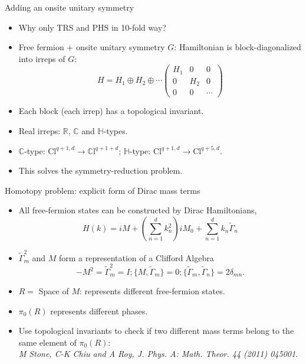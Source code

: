 \documentclass[xcolor=table, 11pt, aspectratio=169]{beamer}
\begin{document}
    \begin{frame}{Adding an onsite unitary symmetry}
      \begin{itemize}
        \item<1-> Why only TRS and PHS in 10-fold way?
        \item<2-> Free fermion + onsite unitary symmetry $G$: Hamiltonian is block-diagonalized into irreps of $G$:
        \[H=H_1\oplus H_2\oplus\cdots\begin{pmatrix}
          H_1 & 0 & 0\\
          0 & H_2 & 0\\
          0 & 0 & \cdots
        \end{pmatrix}\]
        \item<2-> Each block (each irrep) has a topological invariant.
        \item<3-> Real irreps: $\mathbb R$, $\mathbb C$ and $\mathbb H$-types.
        \item<3-> $\mathbb C$-type: $\mathrm{Cl}^{q+1,d}\rightarrow \mathbb{C}\mathrm{l}^{q+1+d}$;
        $\mathbb H$-type: $\mathrm{Cl}^{q+1,d}\rightarrow \mathrm{Cl}^{q+5,d}$.
        \item<4-> This solves the symmetry-reduction problem.
      \end{itemize}
    \end{frame}

    \begin{frame}{Homotopy problem: explicit form of Dirac mass terms}
      \begin{itemize}
        \item All free-fermion states can be constructed by Dirac Hamiltonians,
        \[H(k)=iM+\left(\sum_{n=1}^d k_n^2\right)iM_0+\sum_{n=1}^d k_n\tilde{\Gamma}_n\]
        \item $\tilde \Gamma_m^2$ and $M$ form a representation of a Clifford Algebra
        \[-M^2=\tilde \Gamma_m^2=I; \{M,\tilde\Gamma_m\}=0;
        \{\tilde\Gamma_m,\tilde\Gamma_n\}=2\delta_{mn}.\]
        \item $R=$ Space of $M$: represents different free-fermion states.
        \item $\pi_0(R)$ represents different phases.
        \item Use topological invariants to check if two different mass terms belong to the same element of $\pi_0(R)$:\\
        \emph{M Stone, C-K Chiu and A Roy, J. Phys. A: Math. Theor. 44 (2011) 045001.}
      \end{itemize}
    \end{frame}
      
\end{document}
